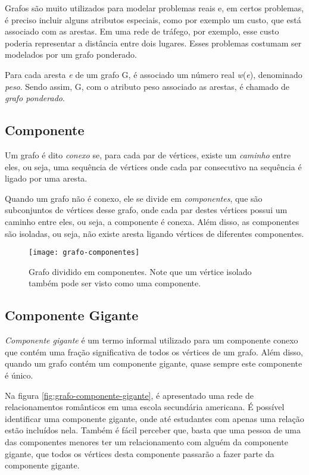 Grafos são muito utilizados para modelar problemas reais e, em certos problemas, é preciso incluir alguns atributos especiais, como por exemplo um custo, que está associado com as arestas. Em uma rede de tráfego, por exemplo, esse custo poderia representar a distância entre dois lugares. Esses problemas costumam ser modelados por um grafo ponderado.

Para cada aresta \emph{e} de um grafo G, é associado um número real \emph{w}(\emph{e}), denominado \emph{peso}. Sendo assim, G, com o atributo peso associado as arestas, é chamado de \emph{grafo ponderado}.


\subsection{Componente}
\label{conceitos__grafo--componente}

Um grafo é dito \emph{conexo} se, para cada par de vértices, existe um \emph{caminho} entre eles, ou seja, uma sequência de vértices onde cada par consecutivo na sequência é ligado por uma aresta.

Quando um grafo não é conexo, ele se divide em \emph{componentes}, que são subconjuntos de vértices desse grafo, onde cada par destes vértices possui um caminho entre eles, ou seja, a componente é conexa. Além disso, as componentes são isoladas, ou seja, não existe aresta ligando vértices de diferentes componentes.

\begin{figure}[H]
\texttt{[image: grafo-componentes]}
\centering
\caption{Grafo dividido em componentes. Note que um vértice isolado também pode ser visto como uma componente.}
\end{figure}

\subsection{Componente Gigante}
\label{conceitos__grafo--componente-gigante}

\emph{Componente gigante} é um termo informal utilizado para
um componente conexo que contém uma fração significativa de todos os vértices de um grafo. Além disso, quando um grafo contém um componente gigante, quase sempre este componente é único.

Na figura \ref{fig:grafo-componente-gigante}, é apresentado uma rede de relacionamentos românticos em uma escola secundária americana. É possível identificar uma componente gigante, onde até estudantes com apenas uma relação estão incluídos nela. Também é fácil perceber que, basta que uma pessoa de uma das componentes menores ter um relacionamento com alguém da componente gigante, que todos os vértices desta componente passarão a fazer parte da componente gigante.

